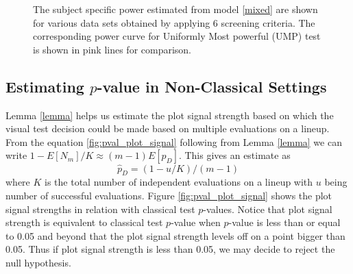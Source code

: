 \documentclass{article}
\begin{document}
\begin{figure}[hbtp]
   \centering
      \caption{The subject specific power estimated from model \ref{mixed} are shown for various data sets obtained by applying 6 screening criteria.  The corresponding power curve for Uniformly Most powerful (UMP) test is shown in pink lines for comparison.}
       \label{fig:power_screening_subject}	
\end{figure}


\subsection{Estimating $p$-value in Non-Classical Settings} 

Lemma \ref{lemma} helps us estimate the plot signal strength based on which the visual test decision could be made based on multiple evaluations on a lineup. From the equation \ref{fig:pval_plot_signal} following from Lemma \ref{lemma} we can write $1 - E[N_m]/K \approx (m-1)E[p_D] $. This gives an estimate as  $$\hat p_D= (1- u/K)/(m-1)$$ where $K$ is the total number of independent evaluations on a lineup with $u$ being number of successful evaluations. Figure \ref{fig:pval_plot_signal} shows the plot signal strengths in relation with classical test $p$-values. Notice that plot signal strength is equivalent to classical test $p$-value when $p$-value is less than or equal to 0.05 and beyond that the plot signal strength levels off on a point bigger than 0.05. Thus if plot signal strength is less than 0.05, we may decide to reject the null hypothesis.
\end{document}

